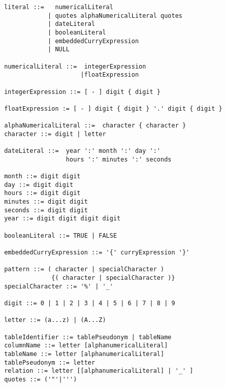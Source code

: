 \begin{lstlisting}
 literal ::=   numericalLiteral                              
             | quotes alphaNumericalLiteral quotes
             | dateLiteral                                   
             | booleanLiteral  
             | embeddedCurryExpression                              
             | NULL

 numericalLiteral ::=  integerExpression 
                      |floatExpression   

 integerExpression ::= [ - ] digit { digit }

 floatExpression := [ - ] digit { digit } '.' digit { digit } 

 alphaNumericalLiteral ::=  character { character }  
 character ::= digit | letter 

 dateLiteral ::=  year ':' month ':' day ':' 
                  hours ':' minutes ':' seconds

 month ::= digit digit
 day ::= digit digit
 hours ::= digit digit
 minutes ::= digit digit
 seconds ::= digit digit
 year ::= digit digit digit digit
 
 booleanLiteral ::= TRUE | FALSE

 embeddedCurryExpression ::= '{' curryExpression '}'

 pattern ::= ( character | specialCharacter )
              {( character | specialCharacter )}             
 specialCharacter ::= '%' | '_'

 digit ::= 0 | 1 | 2 | 3 | 4 | 5 | 6 | 7 | 8 | 9 

 letter ::= (a...z) | (A...Z)

 tableIdentifier ::= tablePseudonym | tableName
 columnName ::= letter [alphanumericalLiteral]
 tableName ::= letter [alphanumericalLiteral]
 tablePseudonym ::= letter
 relation ::= letter [[alphanumericalLiteral] | '_' ]
 quotes ::= ('"'|''')
  
\end{lstlisting}


